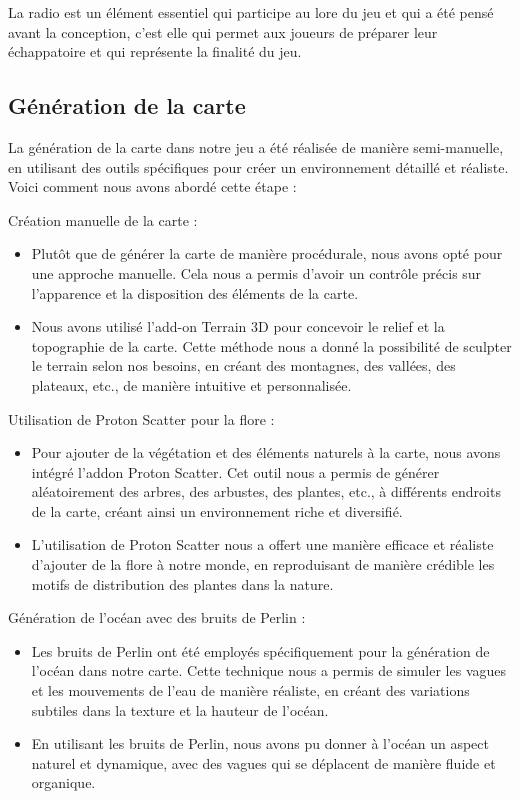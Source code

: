 \documentclass[
	article,			%
	11pt,				%
	oneside,			%
	a4paper,			%
	chapter=TITLE,
	french,			%
	sumario=tradicional
	]{base_nt}
\begin{document}
La radio est un élément essentiel qui participe au lore du jeu et qui a été pensé avant la conception, c'est elle qui permet aux joueurs de préparer leur échappatoire et qui représente la finalité du jeu.

\newpage

\subsection{Génération de la carte}

La génération de la carte dans notre jeu a été réalisée de manière semi-manuelle, en utilisant des outils spécifiques pour créer un environnement détaillé et réaliste. Voici comment nous avons abordé cette étape :

Création manuelle de la carte :

\begin{itemize}
    \item Plutôt que de générer la carte de manière procédurale, nous avons opté pour une approche manuelle. Cela nous a permis d'avoir un contrôle précis sur l'apparence et la disposition des éléments de la carte.
    \item Nous avons utilisé l'add-on Terrain 3D pour concevoir le relief et la topographie de la carte. Cette méthode nous a donné la possibilité de sculpter le terrain selon nos besoins, en créant des montagnes, des vallées, des plateaux, etc., de manière intuitive et personnalisée.
\end{itemize}

Utilisation de Proton Scatter pour la flore :

\begin{itemize}
    \item Pour ajouter de la végétation et des éléments naturels à la carte, nous avons intégré l'addon Proton Scatter. Cet outil nous a permis de générer aléatoirement des arbres, des arbustes, des plantes, etc., à différents endroits de la carte, créant ainsi un environnement riche et diversifié.
    \item L'utilisation de Proton Scatter nous a offert une manière efficace et réaliste d'ajouter de la flore à notre monde, en reproduisant de manière crédible les motifs de distribution des plantes dans la nature.
\end{itemize}

Génération de l'océan avec des bruits de Perlin :

\begin{itemize}
    \item Les bruits de Perlin ont été employés spécifiquement pour la génération de l'océan dans notre carte. Cette technique nous a permis de simuler les vagues et les mouvements de l'eau de manière réaliste, en créant des variations subtiles dans la texture et la hauteur de l'océan.
    \item En utilisant les bruits de Perlin, nous avons pu donner à l'océan un aspect naturel et dynamique, avec des vagues qui se déplacent de manière fluide et organique.
\end{itemize}
\end{document}
